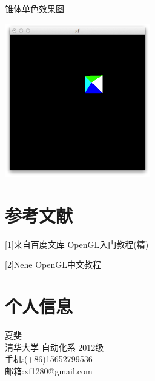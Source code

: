 \documentclass[12pt]{article}
\begin{document}
锥体单色效果图
\begin{center}
\includegraphics[width = 2.5in]{4.png} 
\end{center}
\section{参考文献}
[1]来自百度文库 OpenGL入门教程(精)

[2]Nehe OpenGL中文教程
\section{个人信息}
 \noindent
夏斐\\
清华大学 自动化系 2012级\\
手机:(+86)15652799536\\
邮箱:xf1280@gmail.com\\
\end{document}

